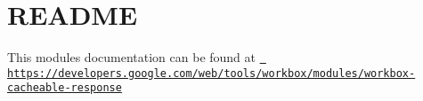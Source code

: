 \chapter{README}
\hypertarget{md_node__modules_2workbox-cacheable-response_2README}{}\label{md_node__modules_2workbox-cacheable-response_2README}
This module\textquotesingle{}s documentation can be found at \href{https://developers.google.com/web/tools/workbox/modules/workbox-cacheable-response}{\texttt{ https\+://developers.\+google.\+com/web/tools/workbox/modules/workbox-\/cacheable-\/response}} 